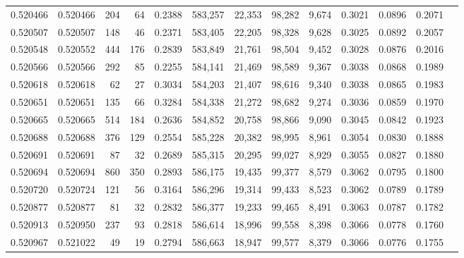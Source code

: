 \begin{tabular}{rrrrrrrrrrrrr}
0.520466 & 0.520466 &   204 &    64 &                                     0.2388 & 583,257 &  22,353 &  98,282 &   9,674 & 0.3021 & 0.0896 & 0.2071 \\
0.520507 & 0.520507 &   148 &    46 &                                     0.2371 & 583,405 &  22,205 &  98,328 &   9,628 & 0.3025 & 0.0892 & 0.2057 \\
0.520548 & 0.520552 &   444 &   176 &                                     0.2839 & 583,849 &  21,761 &  98,504 &   9,452 & 0.3028 & 0.0876 & 0.2016 \\
0.520566 & 0.520566 &   292 &    85 &                                     0.2255 & 584,141 &  21,469 &  98,589 &   9,367 & 0.3038 & 0.0868 & 0.1989 \\
0.520618 & 0.520618 &    62 &    27 &                                     0.3034 & 584,203 &  21,407 &  98,616 &   9,340 & 0.3038 & 0.0865 & 0.1983 \\
0.520651 & 0.520651 &   135 &    66 &                                     0.3284 & 584,338 &  21,272 &  98,682 &   9,274 & 0.3036 & 0.0859 & 0.1970 \\
0.520665 & 0.520665 &   514 &   184 &                                     0.2636 & 584,852 &  20,758 &  98,866 &   9,090 & 0.3045 & 0.0842 & 0.1923 \\
0.520688 & 0.520688 &   376 &   129 &                                     0.2554 & 585,228 &  20,382 &  98,995 &   8,961 & 0.3054 & 0.0830 & 0.1888 \\
0.520691 & 0.520691 &    87 &    32 &                                     0.2689 & 585,315 &  20,295 &  99,027 &   8,929 & 0.3055 & 0.0827 & 0.1880 \\
0.520694 & 0.520694 &   860 &   350 &                                     0.2893 & 586,175 &  19,435 &  99,377 &   8,579 & 0.3062 & 0.0795 & 0.1800 \\
0.520720 & 0.520724 &   121 &    56 &                                     0.3164 & 586,296 &  19,314 &  99,433 &   8,523 & 0.3062 & 0.0789 & 0.1789 \\
0.520877 & 0.520877 &    81 &    32 &                                     0.2832 & 586,377 &  19,233 &  99,465 &   8,491 & 0.3063 & 0.0787 & 0.1782 \\
0.520913 & 0.520950 &   237 &    93 &                                     0.2818 & 586,614 &  18,996 &  99,558 &   8,398 & 0.3066 & 0.0778 & 0.1760 \\
0.520967 & 0.521022 &    49 &    19 &                                     0.2794 & 586,663 &  18,947 &  99,577 &   8,379 & 0.3066 & 0.0776 & 0.1755 \\

\end{tabular}
